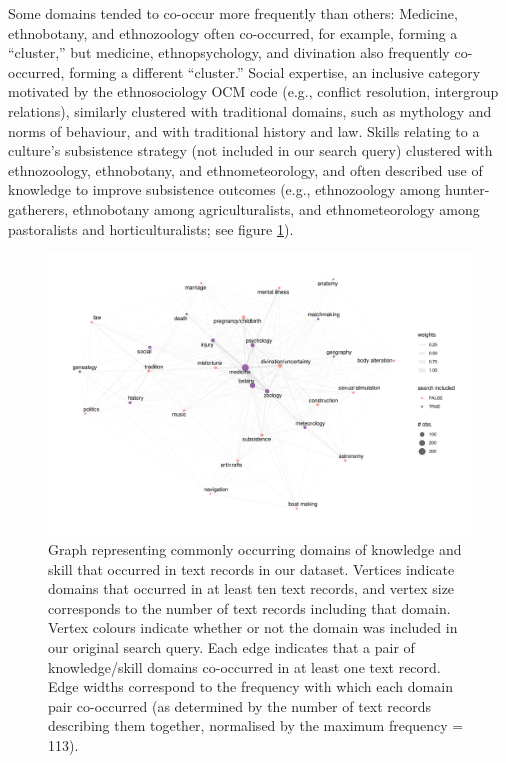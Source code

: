 \documentclass[
  11pt,
]{article}
\begin{document}
Some domains tended to co-occur more frequently than others: Medicine, ethnobotany, and ethnozoology often co-occurred, for example, forming a ``cluster,'' but medicine, ethnopsychology, and divination also frequently co-occurred, forming a different ``cluster.'' Social expertise, an inclusive category motivated by the ethnosociology OCM code (e.g., conflict resolution, intergroup relations), similarly clustered with traditional domains, such as mythology and norms of behaviour, and with traditional history and law. Skills relating to a culture's subsistence strategy (not included in our search query) clustered with ethnozoology, ethnobotany, and ethnometeorology, and often described use of knowledge to improve subsistence outcomes (e.g., ethnozoology among hunter-gatherers, ethnobotany among agriculturalists, and ethnometeorology among pastoralists and horticulturalists; see figure \ref{fig:domainplot}).

\begin{landscape}

\begin{figure}

{\centering \includegraphics{conceptual-experts-paper_files/figure-latex/domainplot-1} 

}

\caption{Graph representing commonly occurring domains of knowledge and skill that occurred in text records in our dataset. Vertices indicate domains that occurred in at least ten text records, and vertex size corresponds to the number of text records including that domain. Vertex colours indicate whether or not the domain was included in our original search query. Each edge indicates that a pair of knowledge/skill domains co-occurred in at least one text record. Edge widths correspond to the frequency with which each domain pair co-occurred (as determined by the number of text records describing them together, normalised by the maximum frequency = 113).}\label{fig:domainplot}
\end{figure}

\end{landscape}
\end{document}

